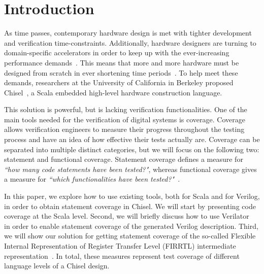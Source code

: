 \documentclass[a4paper]{IEEEtran}
\newcommand{\martin}[1]{{\color{blue} Martin: #1}}
\begin{document}

\section{Introduction}
\label{sec:objectives}
As time passes, contemporary hardware design is met with tighter development and verification time-constraints. Additionally, hardware designers are turning to domain-specific accelerators in order to keep up with the ever-increasing performance demands~\cite{henn-patt:turing:2019}. This means that more and more hardware must be designed from scratch in ever shortening time periods~\cite{domain-hw-acc:2020}.  To help meet these demands, researchers at the University of California in Berkeley proposed Chisel~\cite{chisel:dac2012}, a Scala embedded high-level hardware construction language.

This solution is powerful, but is lacking verification functionalities. One of the main tools needed for the verification of digital systems is coverage. Coverage allows verification engineers to measure their progress throughout the testing process and have an idea of how effective their tests actually are. Coverage can be separated into multiple distinct categories, but we will focus on the following two: statement and functional coverage. Statement coverage defines a measure for \textit{``how many code statements have been tested?"}, whereas functional coverage gives a measure for \textit{``which functionalities have been tested?"}~\cite{spear2008systemverilog}.


In this paper, we explore how to use existing tools, both for Scala and for Verilog, in order to obtain statement coverage in Chisel. We will start by presenting code coverage at the Scala level. Second, we will briefly discuss how to use Verilator~\cite{verilator} in order to enable statement coverage of the generated Verilog description. Third, we will show our solution for getting statement coverage of the so-called Flexible Internal Representation of Register Transfer Level (FIRRTL) intermediate representation~\cite{firrtl}. In total, these measures represent test coverage of different language levels of a Chisel design.
\end{document}
